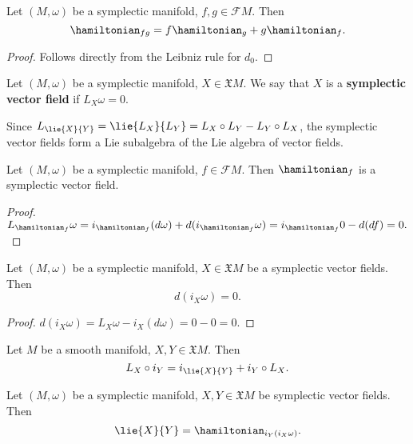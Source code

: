 \begin{proposition}
  Let $(M, \omega)$ be a symplectic manifold, $f, g \in \mathcal{F} M$.
  Then
  \begin{equation}
    \hamiltonian_{f g} = f \hamiltonian_g + g \hamiltonian_f.
  \end{equation}
\end{proposition}
\begin{proof}
  Follows directly from the Leibniz rule for $d_0$.
\end{proof}
\begin{definition}
  Let $(M, \omega)$ be a symplectic manifold, $X \in \mathfrak{X} M$.
  We say that $X$ is a \textbf{symplectic vector field} if $L_X \omega = 0$.
\end{definition}
\begin{remark}
  Since $L_{\lie{X}{Y}} = \lie{L_X}{L_Y} = L_X \circ L_Y - L_Y \circ L_X$,
  the symplectic vector fields form a Lie subalgebra of the Lie algebra of
  vector fields.
\end{remark}
\begin{proposition}
  Let $(M, \omega)$ be a symplectic manifold, $f \in \mathcal{F} M$.
  Then $\hamiltonian_f$ is a symplectic vector field.
\end{proposition}
\begin{proof}
  $
    L_{\hamiltonian_f} \omega
    = i_{\hamiltonian_f}(d \omega) + d(i_{\hamiltonian_f} \omega)
    = i_{\hamiltonian_f} 0 - d(d f)
    = 0.
  $
\end{proof}
\begin{proposition}
  Let
    $(M, \omega)$ be a symplectic manifold,
    $X \in \mathfrak{X} M$ be a symplectic vector fields.
  Then
  \begin{equation}
    d(i_X \omega) = 0.
  \end{equation}
\end{proposition}
\begin{proof}
  $
    d(i_X \omega)
    = L_X \omega - i_X(d \omega)
    = 0 - 0
    = 0.
  $
\end{proof}
\begin{proposition}
  Let $M$ be a smooth manifold, $X, Y \in \mathfrak{X} M$.
  Then
  \begin{equation}
    L_X \circ i_Y = i_{\lie{X}{Y}} + i_Y \circ L_X.
  \end{equation}
\end{proposition}
\begin{proposition}
  Let
    $(M, \omega)$ be a symplectic manifold,
    $X, Y \in \mathfrak{X} M$ be symplectic vector fields.
  Then
  \begin{equation}
    \lie{X}{Y} = \hamiltonian_{i_Y(i_X \omega)}.
  \end{equation}
\end{proposition}
